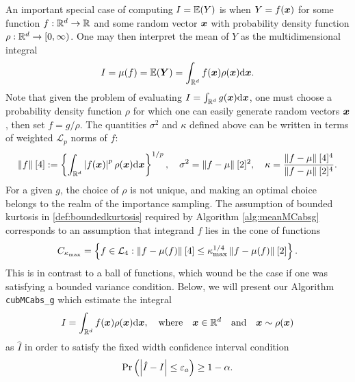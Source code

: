 \documentclass{iitthesis}
\theoremstyle{definition}
\begin{document}
An important special case of computing $I =\mathbb{E}(Y)$ is when $Y = f(\boldsymbol{x})$ for some function $f:\mathbb{R}^d \to \mathbb{R}$ and some random vector $\boldsymbol{x}$ with probability density function $\rho: \mathbb{R}^d \to [0,\infty)$. One may then interpret the mean of $Y$ as the multidimensional integral
\begin{align*}
I= \mu(f) = \mathbb{E}(\boldsymbol{Y}) = \int_{\mathbb{R}^d}f(\boldsymbol{x})\rho(\boldsymbol{x}){\rm d} \boldsymbol{x}.
\end{align*}
Note that given the problem of evaluating $I = \int_{\mathbb{R}^d}g(\boldsymbol{x}){\rm d}\boldsymbol{x}$, one must choose a probability density function $\rho$ for which one can easily generate random vectors $\boldsymbol{x}$, then set $f = g/\rho$. The quantities $\sigma^2$ and $\kappa$ defined above can be written in terms of weighted $\mathcal{L}_p$ norms of $f$:
\begin{align*}
\left \lVert f \right \rVert_{{}}[4]:=\left\{ \int_{\mathbb{R}^d}\left \lvert f(\boldsymbol{x}) \right \rvert^p\rho(\boldsymbol{x}){\rm d}\boldsymbol{x}\right\}^{1/p}, \quad \sigma^2 = \left \lVert f-\mu \right \rVert_{{}}[2]^2,\quad \kappa = \frac{\left \lVert f-\mu \right \rVert_{{}}[4]^4}{\left \lVert f-\mu \right \rVert_{{}}[2]^4}.
\end{align*}
For a given $g$, the choice of $\rho$ is not unique, and making an optimal choice belongs to the realm of the importance sampling. The assumption of bounded kurtosis in \eqref{def:boundedkurtosis} required by Algorithm \ref{alg:meanMCabsg} corresponds to an assumption that integrand $f$ lies in the cone of functions \cite{CDHHZ13}
\begin{align*}
C_{\kappa_{\max}} = \left\{ f \in \mathcal{L}_4: \left \lVert f-\mu(f) \right \rVert_{{}}[4] \leq \kappa_{\max}^{1/4} \left \lVert f-\mu(f) \right \rVert_{{}}[2]\right\}.
\end{align*}
This is in contrast to a ball of functions, which wound be the case if one was satisfying a bounded variance condition.
Below, we will present our Algorithm {\tt cubMCabs\_g} which estimate the integral
$$I = \int_{\mathbb{R}^d} f(\boldsymbol{x})\rho(\boldsymbol{x}){\rm d}\boldsymbol{x}, \quad \text{where}\quad \boldsymbol{x} \in \mathbb{R}^d \quad \text{and}\quad  \boldsymbol{x} \sim \rho(\boldsymbol{x})$$
as $\hat{I}$ in order to satisfy the fixed width confidence interval condition
\begin{align}\label{cubMCabsgCI}
\Pr \left(\left \lvert \hat{I}-I \right \rvert \leq \varepsilon_a \right) \geq 1-\alpha.
\end{align}
\end{document}
